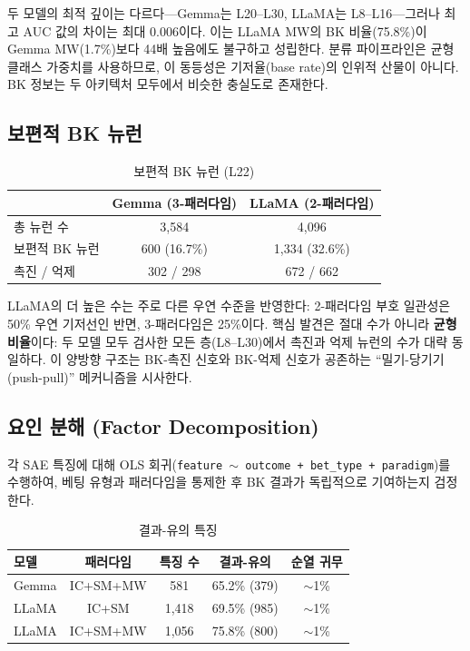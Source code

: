 \documentclass[11pt,a4paper]{article}
\begin{document}
두 모델의 최적 깊이는 다르다---Gemma는 L20--L30, LLaMA는 L8--L16---그러나 최고 AUC 값의 차이는 최대 0.006이다. 이는 LLaMA MW의 BK 비율(75.8\%)이 Gemma MW(1.7\%)보다 44배 높음에도 불구하고 성립한다. 분류 파이프라인은 균형 클래스 가중치를 사용하므로, 이 동등성은 기저율(base rate)의 인위적 산물이 아니다. BK 정보는 두 아키텍처 모두에서 비슷한 충실도로 존재한다.

\subsection{보편적 BK 뉴런}

\begin{table}[H]
\centering
\caption{보편적 BK 뉴런 (L22)}
\begin{tabular}{lcc}
\toprule
 & \textbf{Gemma (3-패러다임)} & \textbf{LLaMA (2-패러다임)} \\
\midrule
총 뉴런 수 & 3{,}584 & 4{,}096 \\
보편적 BK 뉴런 & 600 (16.7\%) & 1{,}334 (32.6\%) \\
촉진 / 억제 & 302 / 298 & 672 / 662 \\
\bottomrule
\end{tabular}
\end{table}

LLaMA의 더 높은 수는 주로 다른 우연 수준을 반영한다: 2-패러다임 부호 일관성은 50\% 우연 기저선인 반면, 3-패러다임은 25\%이다. 핵심 발견은 절대 수가 아니라 \textbf{균형 비율}이다: 두 모델 모두 검사한 모든 층(L8--L30)에서 촉진과 억제 뉴런의 수가 대략 동일하다. 이 양방향 구조는 BK-촉진 신호와 BK-억제 신호가 공존하는 ``밀기-당기기(push-pull)'' 메커니즘을 시사한다.

\subsection{요인 분해 (Factor Decomposition)}

각 SAE 특징에 대해 OLS 회귀(\texttt{feature $\sim$ outcome + bet\_type + paradigm})를 수행하여, 베팅 유형과 패러다임을 통제한 후 BK 결과가 독립적으로 기여하는지 검정한다.

\begin{table}[H]
\centering
\caption{결과-유의 특징}
\begin{tabular}{lcccc}
\toprule
\textbf{모델} & \textbf{패러다임} & \textbf{특징 수} & \textbf{결과-유의} & \textbf{순열 귀무} \\
\midrule
Gemma & IC+SM+MW & 581 & 65.2\% (379) & ${\sim}$1\% \\
LLaMA & IC+SM & 1{,}418 & 69.5\% (985) & ${\sim}$1\% \\
LLaMA & IC+SM+MW & 1{,}056 & 75.8\% (800) & ${\sim}$1\% \\
\bottomrule
\end{tabular}
\end{table}
\end{document}
